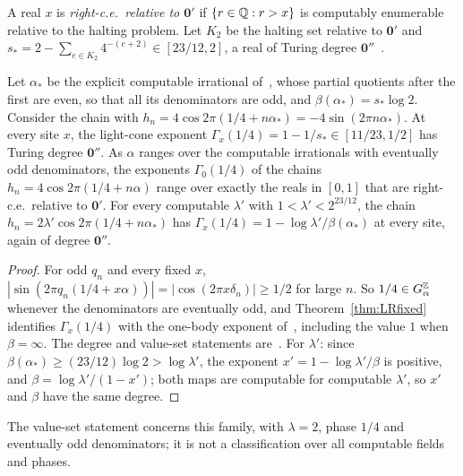 A real $x$ is \emph{right-c.e.\ relative to $\mathbf 0'$} if $\{r\in\mathbb Q:r>x\}$ is computably enumerable relative to the halting problem. Let $K_2$ be the halting set relative to $\mathbf 0'$ and $s_*=2-\sum_{e\in K_2}4^{-(e+2)}\in[23/12,2]$, a real of Turing degree $\mathbf 0''$~\cite[proof of Theorem~D]{DMamo}.

\begin{corollary}\label{cor:LRdeg}
Let $\alpha_*$ be the explicit computable irrational of~\cite[Theorem~D(3)]{DMamo}, whose partial quotients after the first are even, so that all its denominators are odd, and $\beta(\alpha_*)=s_*\log2$. Consider the chain with $h_n=4\cos2\pi(1/4+n\alpha_*)=-4\sin(2\pi n\alpha_*)$. At every site $x$, the light-cone exponent $\Gamma_x(1/4)=1-1/s_*\in[11/23,1/2]$ has Turing degree $\mathbf 0''$. As $\alpha$ ranges over the computable irrationals with eventually odd denominators, the exponents $\Gamma_0(1/4)$ of the chains $h_n=4\cos2\pi(1/4+n\alpha)$ range over exactly the reals in $[0,1]$ that are right-c.e.\ relative to $\mathbf 0'$. For every computable $\lambda'$ with $1<\lambda'<2^{23/12}$, the chain $h_n=2\lambda'\cos2\pi(1/4+n\alpha_*)$ has $\Gamma_x(1/4)=1-\log\lambda'/\beta(\alpha_*)$ at every site, again of degree $\mathbf 0''$.
\end{corollary}

\begin{proof}
For odd $q_n$ and every fixed $x$, $|\sin(2\pi q_n(1/4+x\alpha))|=|\cos(2\pi x\delta_n)|\ge1/2$ for large $n$. So $1/4\in G_\alpha^\mathbb Z$ whenever the denominators are eventually odd, and Theorem~\ref{thm:LRfixed} identifies $\Gamma_x(1/4)$ with the one-body exponent of~\cite[Theorem~D]{DMamo}, including the value $1$ when $\beta=\infty$. The degree and value-set statements are~\cite[Theorem~D(2),(3)]{DMamo}. For $\lambda'$: since $\beta(\alpha_*)\ge(23/12)\log2>\log\lambda'$, the exponent $x'=1-\log\lambda'/\beta$ is positive, and $\beta=\log\lambda'/(1-x')$; both maps are computable for computable $\lambda'$, so $x'$ and $\beta$ have the same degree.
\end{proof}

The value-set statement concerns this family, with $\lambda=2$, phase $1/4$ and eventually odd denominators; it is not a classification over all computable fields and phases.

